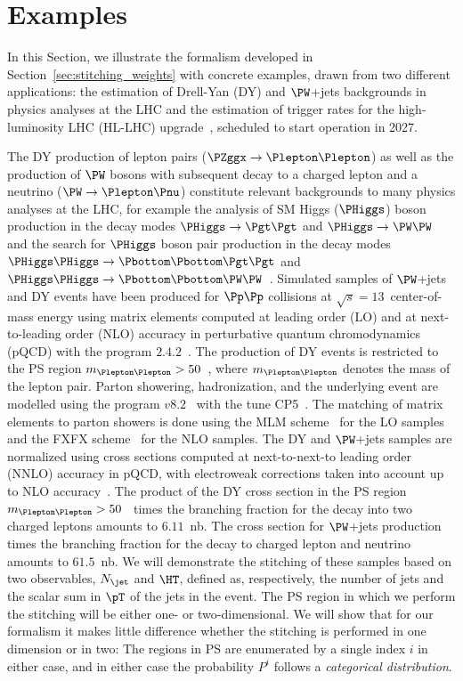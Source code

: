 \section{Examples}
\label{sec:examples}

In this Section, we illustrate the formalism developed in Section~\ref{sec:stitching_weights} with concrete examples,
drawn from two different applications: the estimation of Drell-Yan (DY) and $\PW$+jets backgrounds in physics analyses at the LHC
and the estimation of trigger rates for the high-luminosity LHC (HL-LHC) upgrade~\cite{TDR_Phase2_LHC},
scheduled to start operation in 2027.

The DY production of lepton pairs ($\PZggx \to \Plepton\Plepton$) as well as the production of $\PW$ bosons with subsequent decay to a charged lepton and a neutrino ($\PW \to \Plepton\Pnu$)
constitute relevant backgrounds to many physics analyses at the LHC,
for example the analysis of SM Higgs ($\PHiggs$) boson production in the decay modes $\PHiggs \to \Pgt\Pgt$ and $\PHiggs \to \PW\PW$
and the search for $\PHiggs$ boson pair production in the decay modes $\PHiggs\PHiggs \to \Pbottom\Pbottom\Pgt\Pgt$ and 
$\PHiggs\PHiggs \to \Pbottom\Pbottom\PW\PW$~\cite{ATLAS:2014aga,Aad:2015vsa,Aad:2019yxi,Aaboud:2018sfw,CMS-HIG-13-004,CMS-HIG-13-027,CMS-HIG-17-002,CMS-HIG-17-006}.
Simulated samples of $\PW$+jets and DY events have been produced for $\Pp\Pp$ collisions at $\sqrt{s}=13$~\TeV center-of-mass energy
using matrix elements computed at leading order (LO) and at next-to-leading order (NLO) accuracy in perturbative quantum chromodynamics (pQCD)
with the program \MGvATNLO $2.4.2$~\cite{Alwall:2014hca}.
The production of DY events is restricted to the PS region $m_{\Plepton\Plepton} > 50$~\GeV, where $m_{\Plepton\Plepton}$ denotes the mass of the lepton pair.
Parton showering, hadronization, and the underlying event are modelled using the program \PYTHIA $v8.2$~\cite{Sjostrand:2014zea} with the tune \textrm{CP5}~\cite{Sirunyan:2019dfx}.
The matching of matrix elements to parton showers is done using the \textrm{MLM} scheme~\cite{Alwall:2007fs} for the LO samples
and the \textrm{FXFX} scheme~\cite{Frederix:2012ps} for the NLO samples.
The DY and $\PW$+jets samples are normalized using cross sections computed at next-to-next-to leading order (NNLO) accuracy in pQCD,
with electroweak corrections taken into account up to NLO accuracy~\cite{Li:2012wna}.
The product of the DY cross section in the PS region $m_{\Plepton\Plepton} > 50$~\GeV
times the branching fraction for the decay into two charged leptons amounts to $6.11$~nb.
The cross section for $\PW$+jets production times the branching fraction for the decay to charged lepton and neutrino amounts to $61.5$~nb.
We will demonstrate the stitching of these samples based on two observables,
$N_{\jet}$ and $\HT$, defined as, respectively, the number of jets and the scalar sum in $\pT$ of the jets in the event.
The PS region in which we perform the stitching will be either one- or two-dimensional.
We will show that for our formalism
it makes little difference whether the stitching is performed in one dimension or in two:
The regions in PS are enumerated by a single index $i$ in either case,
and in either case the probability $P^{i}$ follows a {\em categorical distribution}.

